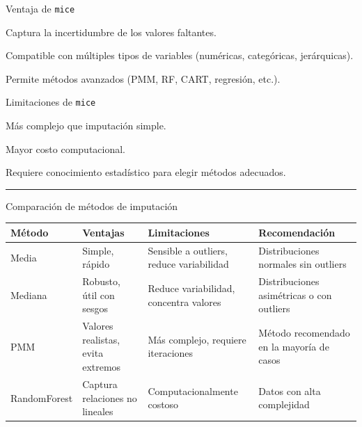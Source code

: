 \documentclass[
]{book}
\begin{document}
{} Ventaja de \texttt{mice}

Captura la incertidumbre de los valores faltantes.

Compatible con múltiples tipos de variables (numéricas, categóricas, jerárquicas).

Permite métodos avanzados (PMM, RF, CART, regresión, etc.).

{} Limitaciones de \texttt{mice}

Más complejo que imputación simple.

Mayor costo computacional.

Requiere conocimiento estadístico para elegir métodos adecuados.

\begin{center}\rule{0.5\linewidth}{0.5pt}\end{center}

Comparación de métodos de imputación

\begin{longtable}[]{@{}
  >{\raggedright\arraybackslash}p{}
  >{\raggedright\arraybackslash}p{}
  >{\raggedright\arraybackslash}p{}
  >{\raggedright\arraybackslash}p{}@{}}
\toprule\noalign{}
\begin{minipage}[b]{\linewidth}\raggedright
Método
\end{minipage} & \begin{minipage}[b]{\linewidth}\raggedright
Ventajas
\end{minipage} & \begin{minipage}[b]{\linewidth}\raggedright
Limitaciones
\end{minipage} & \begin{minipage}[b]{\linewidth}\raggedright
Recomendación
\end{minipage} \\
\midrule\noalign{}
\endhead
\bottomrule\noalign{}
\endlastfoot
Media & Simple, rápido & Sensible a outliers, reduce variabilidad & Distribuciones normales sin outliers \\
Mediana & Robusto, útil con sesgos & Reduce variabilidad, concentra valores & Distribuciones asimétricas o con outliers \\
PMM & Valores realistas, evita extremos & Más complejo, requiere iteraciones & Método recomendado en la mayoría de casos \\
RandomForest & Captura relaciones no lineales & Computacionalmente costoso & Datos con alta complejidad \\
\end{longtable}
\end{document}
